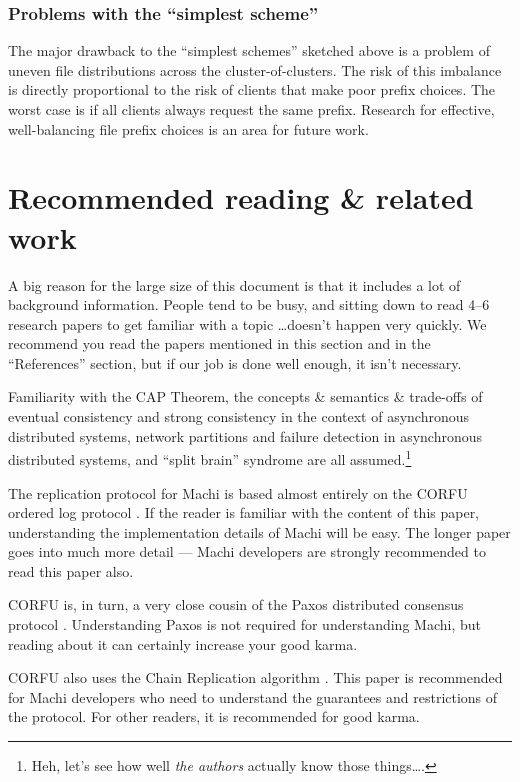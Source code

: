 \documentclass[preprint,10pt]{sigplanconf}
\begin{document}
\subsubsection{Problems with the ``simplest scheme''}

The major drawback to the ``simplest schemes'' sketched above is a
problem of uneven file distributions across the cluster-of-clusters.
The risk of this imbalance is directly proportional to the risk of
clients that make poor prefix choices.  The worst case is if all
clients always request the same prefix.  Research for effective,
well-balancing file prefix choices is an area for future work.

\section{Recommended reading \& related work}

A big reason for the large size of this document is that it includes a
lot of background information.
People tend to be busy, and sitting down to
read 4--6 research papers to get familiar with a topic \ldots doesn't
happen very quickly.  We recommend you read the papers mentioned in
this section and in the ``References'' section, but if our job is
done well enough, it isn't necessary.

Familiarity with the CAP Theorem, the concepts \& semantics \&
trade-offs of eventual consistency and strong consistency in the
context of asynchronous distributed systems, network partitions and
failure detection in asynchronous distributed systems, and ``split
brain'' syndrome are all assumed.\footnote{Heh, let's see how well
{\em the authors} actually know those things\ldots.}

The replication protocol for Machi is based almost entirely on the CORFU
ordered log protocol \cite{corfu1}.  If the reader is familiar with
the content of this paper, understanding the implementation details of
Machi will be easy.  The longer paper \cite{corfu2} goes into much
more detail --- Machi developers are strongly recommended to read this paper
also.

CORFU is, in turn, a very close cousin of the Paxos distributed
consensus protocol \cite{paxos-made-simple}.  Understanding Paxos is
not required for understanding Machi, but reading about it can certainly
increase your good karma.

CORFU also uses the Chain Replication algorithm
\cite{chain-replication}.  This paper is recommended for Machi
developers who need to understand the guarantees and restrictions of
the protocol.  For other readers, it is recommended for good karma.
\end{document}
